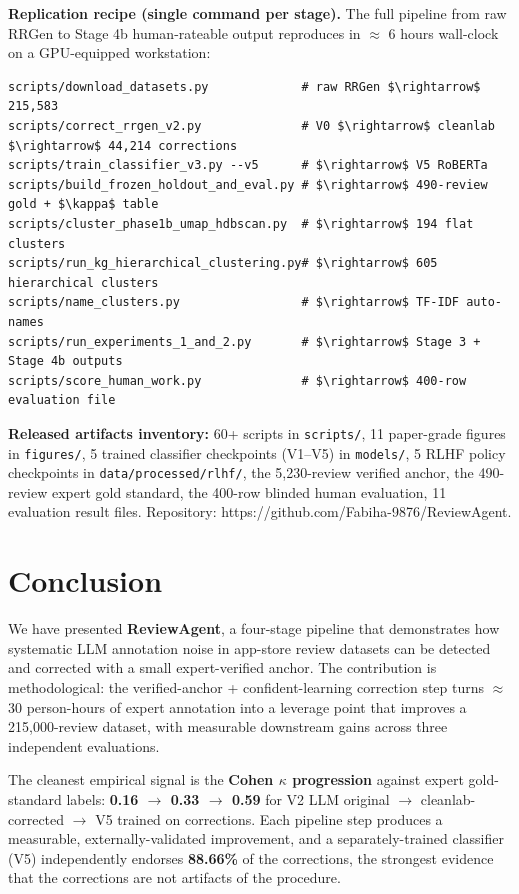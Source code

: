 \documentclass[sigconf, nonacm, anonymous, balance=false]{acmart}
\begin{document}
\textbf{Replication recipe (single command per stage).} The full pipeline from raw RRGen to Stage 4b human-rateable output reproduces in $\approx$ 6 hours wall-clock on a GPU-equipped workstation:

\begin{verbatim}
scripts/download_datasets.py             # raw RRGen $\rightarrow$ 215,583
scripts/correct_rrgen_v2.py              # V0 $\rightarrow$ cleanlab $\rightarrow$ 44,214 corrections
scripts/train_classifier_v3.py --v5      # $\rightarrow$ V5 RoBERTa
scripts/build_frozen_holdout_and_eval.py # $\rightarrow$ 490-review gold + $\kappa$ table
scripts/cluster_phase1b_umap_hdbscan.py  # $\rightarrow$ 194 flat clusters
scripts/run_kg_hierarchical_clustering.py# $\rightarrow$ 605 hierarchical clusters
scripts/name_clusters.py                 # $\rightarrow$ TF-IDF auto-names
scripts/run_experiments_1_and_2.py       # $\rightarrow$ Stage 3 + Stage 4b outputs
scripts/score_human_work.py              # $\rightarrow$ 400-row evaluation file
\end{verbatim}

\textbf{Released artifacts inventory:} 60+ scripts in \texttt{scripts/}, 11 paper-grade figures in \texttt{figures/}, 5 trained classifier checkpoints (V1--V5) in \texttt{models/}, 5 RLHF policy checkpoints in \texttt{data/processed/rlhf/}, the 5,230-review verified anchor, the 490-review expert gold standard, the 400-row blinded human evaluation, 11 evaluation result files. Repository: https://github.com/Fabiha-9876/ReviewAgent.

\section{Conclusion}\label{conclusion}

We have presented \textbf{ReviewAgent}, a four-stage pipeline that demonstrates how systematic LLM annotation noise in app-store review datasets can be detected and corrected with a small expert-verified anchor. The contribution is methodological: the verified-anchor + confident-learning correction step turns $\approx$30 person-hours of expert annotation into a leverage point that improves a 215,000-review dataset, with measurable downstream gains across three independent evaluations.

The cleanest empirical signal is the \textbf{Cohen $\kappa$ progression} against expert gold-standard labels: \textbf{0.16 $\rightarrow$ 0.33 $\rightarrow$ 0.59} for V2 LLM original $\rightarrow$ cleanlab-corrected $\rightarrow$ V5 trained on corrections. Each pipeline step produces a measurable, externally-validated improvement, and a separately-trained classifier (V5) independently endorses \textbf{88.66\%} of the corrections, the strongest evidence that the corrections are not artifacts of the procedure.
\end{document}

